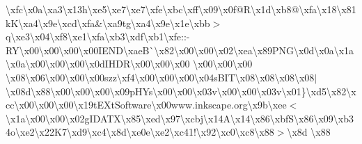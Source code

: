 \begin{DoxyCompactItemize}
\textbackslash{}xfc\textbackslash{}x0a\textbackslash{}xa3\textbackslash{}x13h\textbackslash{}xe5\textbackslash{}xe7\textbackslash{}xe7\textbackslash{}xfe\textbackslash{}xbc\textbackslash{}xff\textbackslash{}x09\textbackslash{}x0f@\+R\textbackslash{}x1d\textbackslash{}xb8@\textbackslash{}xfa\textbackslash{}x18\textbackslash{}x81k\+K\textbackslash{}xa4\textbackslash{}x9e\textbackslash{}xcd\textbackslash{}xfa\&\textbackslash{}xa9tg\textbackslash{}xa4\textbackslash{}x9e\textbackslash{}x1e\textbackslash{}xbb$>$q\textbackslash{}xe3\textbackslash{}x04\textbackslash{}xf8\textbackslash{}xe1\textbackslash{}xfa\textbackslash{}xb3\textbackslash{}xdf\textbackslash{}xb1\textquotesingle{}\textbackslash{}xfe\+::-\/\+R\+Y\textbackslash{}x00\textbackslash{}x00\textbackslash{}x00\textbackslash{}x00\+I\+E\+N\+D\textbackslash{}xae\+B\`{}\textbackslash{}x82\textbackslash{}x00\textbackslash{}x00\textbackslash{}x02\textbackslash{}xea\textbackslash{}x89\+P\+N\+G\textbackslash{}x0d\textbackslash{}x0a\textbackslash{}x1a\textbackslash{}x0a\textbackslash{}x00\textbackslash{}x00\textbackslash{}x00\textbackslash{}x0d\+I\+H\+D\+R\textbackslash{}x00\textbackslash{}x00\textbackslash{}x00 \textbackslash{}x00\textbackslash{}x00\textbackslash{}x00 \textbackslash{}x08\textbackslash{}x06\textbackslash{}x00\textbackslash{}x00\textbackslash{}x00szz\textbackslash{}xf4\textbackslash{}x00\textbackslash{}x00\textbackslash{}x00\textbackslash{}x04s\+B\+I\+T\textbackslash{}x08\textbackslash{}x08\textbackslash{}x08\textbackslash{}x08$\vert$\textbackslash{}x08d\textbackslash{}x88\textbackslash{}x00\textbackslash{}x00\textbackslash{}x00\textbackslash{}x09p\+H\+Ys\textbackslash{}x00\textbackslash{}x00\textbackslash{}x03v\textbackslash{}x00\textbackslash{}x00\textbackslash{}x03v\textbackslash{}x01\}\textbackslash{}xd5\textbackslash{}x82\textbackslash{}xcc\textbackslash{}x00\textbackslash{}x00\textbackslash{}x00\textbackslash{}x19t\+E\+Xt\+Software\textbackslash{}x00www.\+inkscape.\+org\textbackslash{}x9b\textbackslash{}xee$<$\textbackslash{}x1a\textbackslash{}x00\textbackslash{}x00\textbackslash{}x02g\+I\+D\+A\+T\+X\textbackslash{}x85\textbackslash{}xed\textbackslash{}x97\textbackslash{}xcbj\textbackslash{}x14\+A\textbackslash{}x14\textbackslash{}x86\textbackslash{}xbf\+S\textbackslash{}x86\textbackslash{}x09\textbackslash{}xb34o\textbackslash{}xe2\textbackslash{}x22\+K7\textbackslash{}xd9\textbackslash{}xc4\textbackslash{}x8d\textbackslash{}xe0e\textbackslash{}xe2\textbackslash{}xc41!\textbackslash{}x92\textbackslash{}xc0\textbackslash{}xc8\textbackslash{}x88$>$\textbackslash{}x8d \textbackslash{}x88 
\end{DoxyCompactItemize}
